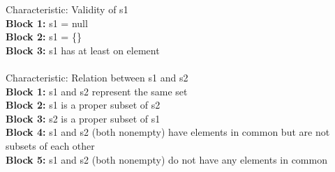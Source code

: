 \documentclass{article}
\begin{document}
Characteristic: Validity of s1 \\
\indent \textbf{Block 1:} s1 = null \\
\indent \textbf{Block 2:} s1 = \{\} \\
\indent \textbf{Block 3:} s1 has at least on element \\\\
Characteristic: Relation between s1 and s2 \\
\indent \textbf{Block 1:} s1 and s2 represent the same set \\
\indent \textbf{Block 2:} s1 is a proper subset of s2 \\
\indent \textbf{Block 3:} s2 is a proper subset of s1 \\
\indent \textbf{Block 4:} s1 and s2 (both nonempty) have elements in common but are not subsets of each other \\
\indent \textbf{Block 5:} s1 and s2 (both nonempty) do not have any elements in common 
\end{document}
